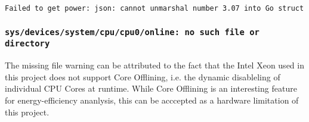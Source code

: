 \begin{lstlisting}[language=bash]
Failed to get power: json: cannot unmarshal number 3.07 into Go struct field Voltages.Voltages.ReadingVolts of type int
\end{lstlisting}

\subsubsection{\texttt{sys/devices/system/cpu/cpu0/online: no such file or directory}}

The missing file warning can be attributed to the fact that the Intel Xeon used in this project does not support Core Offlining, i.e. the dynamic disableling of individual CPU Cores at runtime. While Core Offlining is an interesting feature for energy-efficiency ananlysis, this can be acccepted as a hardware limitation of this project.